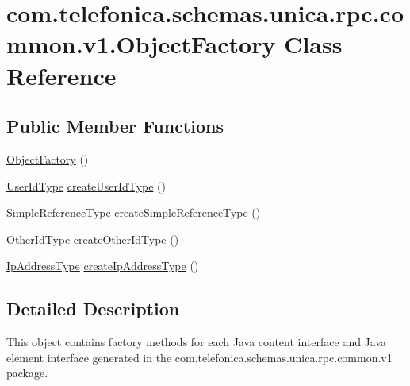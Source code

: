 \hypertarget{classcom_1_1telefonica_1_1schemas_1_1unica_1_1rpc_1_1common_1_1v1_1_1ObjectFactory}{
\section{com.telefonica.schemas.unica.rpc.common.v1.ObjectFactory Class Reference}
\label{classcom_1_1telefonica_1_1schemas_1_1unica_1_1rpc_1_1common_1_1v1_1_1ObjectFactory}
}
\subsection*{Public Member Functions}
\begin{DoxyCompactItemize}
\item 
\hyperlink{classcom_1_1telefonica_1_1schemas_1_1unica_1_1rpc_1_1common_1_1v1_1_1ObjectFactory_ac0dc462b8ff419bf80160943cab091bc}{ObjectFactory} ()
\item 
\hyperlink{classcom_1_1telefonica_1_1schemas_1_1unica_1_1rpc_1_1common_1_1v1_1_1UserIdType}{UserIdType} \hyperlink{classcom_1_1telefonica_1_1schemas_1_1unica_1_1rpc_1_1common_1_1v1_1_1ObjectFactory_a39e04cad392979e32745fa24d704e5d9}{createUserIdType} ()
\item 
\hyperlink{classcom_1_1telefonica_1_1schemas_1_1unica_1_1rpc_1_1common_1_1v1_1_1SimpleReferenceType}{SimpleReferenceType} \hyperlink{classcom_1_1telefonica_1_1schemas_1_1unica_1_1rpc_1_1common_1_1v1_1_1ObjectFactory_abd30025f27d0a29d7ac5f2e38530454a}{createSimpleReferenceType} ()
\item 
\hyperlink{classcom_1_1telefonica_1_1schemas_1_1unica_1_1rpc_1_1common_1_1v1_1_1OtherIdType}{OtherIdType} \hyperlink{classcom_1_1telefonica_1_1schemas_1_1unica_1_1rpc_1_1common_1_1v1_1_1ObjectFactory_ac486eef4305afd53502e0bb7815475fb}{createOtherIdType} ()
\item 
\hyperlink{classcom_1_1telefonica_1_1schemas_1_1unica_1_1rpc_1_1common_1_1v1_1_1IpAddressType}{IpAddressType} \hyperlink{classcom_1_1telefonica_1_1schemas_1_1unica_1_1rpc_1_1common_1_1v1_1_1ObjectFactory_a073191d367d38dbf078232ccdfea5373}{createIpAddressType} ()
\end{DoxyCompactItemize}


\subsection{Detailed Description}
This object contains factory methods for each Java content interface and Java element interface generated in the com.telefonica.schemas.unica.rpc.common.v1 package. 

